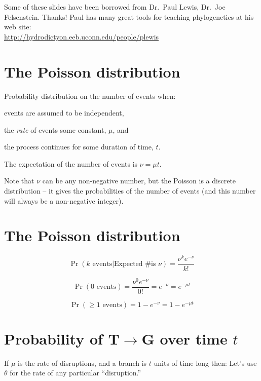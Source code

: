 \documentclass[landscape]{foils}
\newcommand{\disruption}{\theta}
\begin{document}
\pagecolor{white}
\unitlength=1mm
\begin{center}
{\Large Some of these slides have been borrowed from Dr.\ Paul Lewis, Dr.\ Joe Felsenstein. Thanks!}
\vskip 15mm
\large Paul has many great tools for teaching phylogenetics at his web site: \\
\url{http://hydrodictyon.eeb.uconn.edu/people/plewis}
\end{center}




\myNewSlide
 


\myNewSlide
\section*{The Poisson distribution}
Probability distribution on the number of events when:
\begin{compactenum}
	\item events are assumed to be independent,
	\item the {\em rate} of events some constant, $\mu$, and
	\item the process continues for some duration of time, $t$.
\end{compactenum}
The expectation of the number of events is $\nu = \mu t$.

Note that $\nu$ can be any non-negative number, but the Poisson is a discrete distribution -- it gives the probabilities of the number of events (and this number will always be a non-negative integer).

\myNewSlide
\section*{The Poisson distribution}
\Large
\[\Pr(k\mbox{ events}|\mbox{Expected \# is } \nu) = \frac{\nu^k e^{-\nu}}{k !}
\]

\[\Pr(0\mbox{ events}) = \frac{\nu^0 e^{-\nu}}{0 !} = e^{-\nu} = e^{-\mu t}
\]

\[\Pr(\geq 1\mbox{ events}) = 1 - e^{-\nu} = 1 - e^{-\mu t}
\]

\myNewSlide
 

\myNewSlide
\section*{Probability of T$\rightarrow$G over time $t$}
If $\mu$ is the rate of disruptions, and a branch is $t$ units of time long then:
Let's use $\disruption$ for the rate of any particular ``disruption.''
\end{document}
